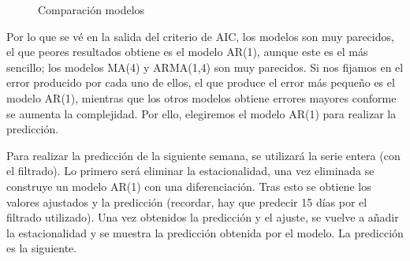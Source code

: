 \begin{figure}[H]
	\centering
	\caption{Comparación modelos}
	\label{fig:14}
\end{figure}

Por lo que se vé en la salida del criterio de AIC, los modelos son muy parecidos, el que peores resultados obtiene es el modelo AR(1), aunque este es el más sencillo; los modelos MA(4) y ARMA(1,4) son muy parecidos. Si nos fijamos en el error producido por cada uno de ellos, el que produce el error más pequeño es el modelo AR(1), mientras que los otros modelos obtiene errores mayores conforme se aumenta la complejidad. Por ello, elegiremos el modelo AR(1) para realizar la predicción.

Para realizar la predicción de la siguiente semana, se utilizará la serie entera (con el filtrado). Lo primero será eliminar la estacionalidad, una vez eliminada se construye un modelo AR(1) con una diferenciación. Tras esto se obtiene los valores ajustados y la predicción (recordar, hay que predecir 15 días por el filtrado utilizado). Una vez obtenidos la predicción y el ajuste, se vuelve a añadir la estacionalidad y se muestra la predicción obtenida por el modelo. La predicción es la siguiente.

